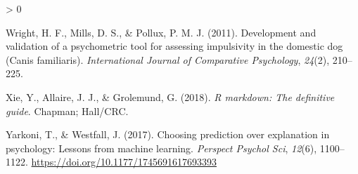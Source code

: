 \documentclass[
  english,
  ,pub,floatsintext]{apa6}
\newlength{\cslhangindent}
\newenvironment{CSLReferences}[2] %
 {%
  \setlength{\parindent}{0pt}
  \ifodd #1 \everypar{\setlength{\hangindent}{\cslhangindent}}\ignorespaces\fi
  \ifnum #2 > 0
  \setlength{\parskip}{#2\baselineskip}
  \fi
 }%
 {}
\begin{document}
\begin{CSLReferences}{1}{0}
\leavevmode\hypertarget{ref-Wright.etal.2011}{}%
Wright, H. F., Mills, D. S., \& Pollux, P. M. J. (2011). Development and validation of a psychometric tool for assessing impulsivity in the domestic dog ({Canis} familiaris). \emph{International Journal of Comparative Psychology}, \emph{24}(2), 210--225.

\leavevmode\hypertarget{ref-R-rmarkdown_a}{}%
Xie, Y., Allaire, J. J., \& Grolemund, G. (2018). \emph{R markdown: The definitive guide}. Chapman; Hall/CRC.

\leavevmode\hypertarget{ref-Yarkoni.Westfall.2017}{}%
Yarkoni, T., \& Westfall, J. (2017). Choosing prediction over explanation in psychology: {Lessons} from machine learning. \emph{Perspect Psychol Sci}, \emph{12}(6), 1100--1122. \url{https://doi.org/10.1177/1745691617693393}

\end{CSLReferences}
\end{document}
